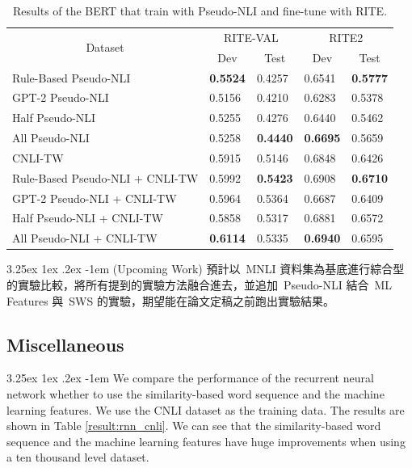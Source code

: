 \documentclass[12pt]{article}
\makeatletter
\renewcommand\paragraph{\@startsection{paragraph}{5}{\z@}%
  {3.25ex \@plus1ex \@minus.2ex}%
  {-1em}%
  {\normalfont\normalsize\bfseries}}
\makeatother
\begin{document}
\begin{CJK*}{UTF8}{bkai}
\begin{spacing}{1.77}
\begin{table}[H]
  \centering
  \setlength{\extrarowheight}{-3pt}
  \caption{Results of the BERT that train with Pseudo-NLI and fine-tune with RITE.}
  \label{result:pseudo_nli_bert}
  \begin{tabular}{|l|l|l|l|l|}
  \hline
  \multicolumn{1}{|c|}{\multirow{2}{*}{Dataset}} & \multicolumn{2}{c|}{RITE-VAL} & \multicolumn{2}{c|}{RITE2} \\ \cline{2-5}
  \multicolumn{1}{|c|}{} & \multicolumn{1}{c|}{Dev} & \multicolumn{1}{c|}{Test} & \multicolumn{1}{c|}{Dev} & \multicolumn{1}{c|}{Test} \\ \hline
  Rule-Based   Pseudo-NLI & \textbf{0.5524} & 0.4257 & 0.6541 & \textbf{0.5777} \\ \hline
  GPT-2   Pseudo-NLI & 0.5156 & 0.4210 & 0.6283 & 0.5378 \\ \hline
  Half   Pseudo-NLI & 0.5255 & 0.4276 & 0.6440 & 0.5462 \\ \hline
  All   Pseudo-NLI & 0.5258 & \textbf{0.4440} & \textbf{0.6695} & 0.5659 \\ \hline \hline
  CNLI-TW & 0.5915 & 0.5146 & 0.6848 & 0.6426 \\ \hline
  Rule-Based   Pseudo-NLI + CNLI-TW & 0.5992 & \textbf{0.5423} & 0.6908 & \textbf{0.6710} \\ \hline
  GPT-2   Pseudo-NLI + CNLI-TW & 0.5964 & 0.5364 & 0.6687 & 0.6409 \\ \hline
  Half   Pseudo-NLI + CNLI-TW & 0.5858 & 0.5317 & 0.6881 & 0.6572 \\ \hline
  All   Pseudo-NLI + CNLI-TW & \textbf{0.6114} & 0.5335 & \textbf{0.6940} & 0.6595 \\ \hline
  \end{tabular}
\end{table}

\paragraph{(Upcoming Work)}
預計以\ MNLI 資料集為基底進行綜合型的實驗比較，將所有提到的實驗方法融合進去，並追加\ Pseudo-NLI 結合\ ML Features 與\ SWS 的實驗，期望能在論文定稿之前跑出實驗結果。

\subsection{Miscellaneous}
\paragraph{}
We compare the performance of the recurrent neural network whether to use the similarity-based word sequence and the machine learning features. We use the CNLI dataset as the training data. The results are shown in Table \ref{result:rnn_cnli}. We can see that the similarity-based word sequence and the machine learning features have huge improvements when using a ten thousand level dataset.


\end{spacing}
\end{CJK*}
\end{document}
